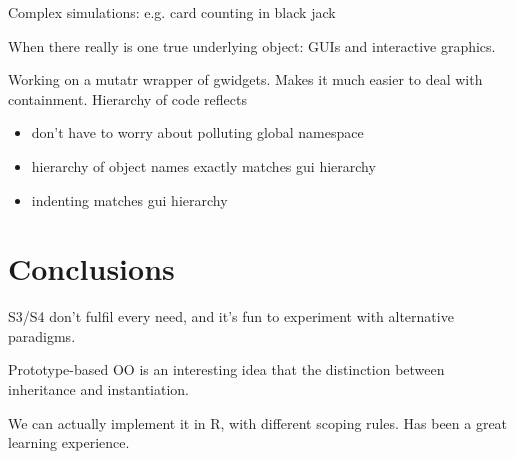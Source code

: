 \documentclass[oneside]{article}
\begin{document}
Complex simulations: e.g. card counting in black jack

When there really is one true underlying object: GUIs and interactive graphics.

Working on a mutatr wrapper of gwidgets.  Makes it much easier to deal with containment.  Hierarchy of code reflects 

\begin{itemize}
  \item don't have to worry about polluting global namespace
  \item hierarchy of object names exactly matches gui hierarchy
  \item indenting matches gui hierarchy
\end{itemize}


\section{Conclusions}
\label{sec:conclusions}

S3/S4 don’t fulfil every need, and it’s fun to experiment with alternative paradigms.

Prototype-based OO is an interesting idea that the distinction between inheritance and instantiation.

We can actually implement it in R, with different scoping rules.  Has been a great learning experience.


\end{document}

